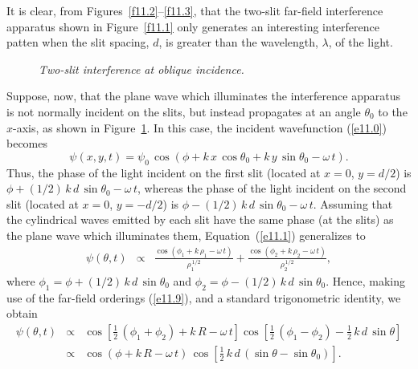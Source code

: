 It is  clear, from Figures~\ref{f11.2}--\ref{f11.3}, that the two-slit far-field interference apparatus shown in Figure~\ref{f11.1}
only generates an interesting interference patten when the slit spacing, $d$, is greater  than the
wavelength, $\lambda$, of the light. 

\begin{figure}
\epsfysize=3.3in
\centerline{}
\caption{\em Two-slit interference at oblique incidence.}\label{f11.5}   
\end{figure}

Suppose, now, that the   plane wave which illuminates the interference apparatus is not normally incident on the slits, but instead propagates at an angle $\theta_0$ to the $x$-axis, as
shown in Figure~\ref{f11.5}. In this case, the incident wavefunction (\ref{e11.0})  becomes
\begin{equation}\label{e11.13}
\psi(x,y,t) = \psi_0\,\cos(\phi + k\,x\,\cos\theta_0+k\,y\,\sin\theta_0-\omega\,t).
\end{equation}
Thus, the phase of the light incident on the first slit (located at $x=0$, $y=d/2$) is
$\phi + (1/2)\,k\,d\,\sin\theta_0-\omega\,t$, whereas the phase of the light incident on the second slit (located at
$x=0$, $y=-d/2$) is $\phi - (1/2)\,k\,d\,\sin\theta_0-\omega\,t$. Assuming that the cylindrical waves
emitted by each slit have the same phase (at the slits) as the plane wave which illuminates them, Equation~(\ref{e11.1})
generalizes to
\begin{eqnarray}\label{e11.14}
\psi(\theta,t)&\propto&\frac{\cos(\phi_1+k\,\rho_1-\omega\,t)}{\rho_1^{\,1/2}}
+\frac{\cos(\phi_2+k\,\rho_2-\omega\,t)}{\rho_2^{\,1/2}},
\end{eqnarray}
where $\phi_1= \phi+(1/2)\,k\,d\,\sin\theta_0$ and $\phi_2=\phi-(1/2)\,k\,d\,\sin\theta_0$. 
Hence, making use of the far-field orderings (\ref{e11.9}), and a standard trigonometric identity, we obtain
\begin{eqnarray}
\psi(\theta,t) &\propto & \cos\left[\frac{1}{2}\,(\phi_1+\phi_2)+ k\,R-\omega\,t\right]\cos
\left[\frac{1}{2}\,(\phi_1-\phi_2)-\frac{1}{2}\,k\,d\,\sin\theta\right]\nonumber\\[0.5ex]
&\propto& \cos(\phi+ k\,R-\omega\,t)\,\cos
\left[\frac{1}{2}\,k\,d\,(\sin\theta-\sin\theta_0)\right].\label{e11.15}
\end{eqnarray}

